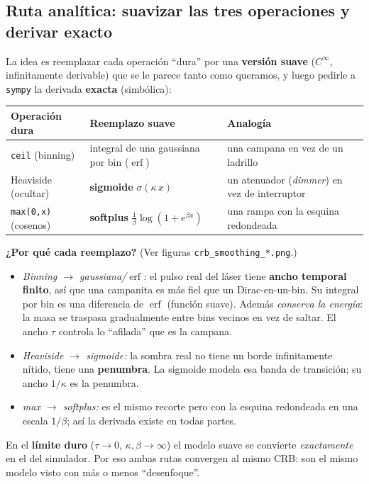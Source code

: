 \documentclass[11pt,a4paper]{article}
\newcommand{\erf}{\operatorname{erf}}
\begin{document}
\subsection{Ruta anal\'itica: suavizar las tres operaciones y derivar exacto}
La idea es reemplazar cada operaci\'on ``dura'' por una \textbf{versi\'on suave}
($C^\infty$, infinitamente derivable) que se le parece tanto como queramos, y
luego pedirle a \texttt{sympy} la derivada \textbf{exacta} (simb\'olica):
\begin{center}
\begin{tabular}{@{}lll@{}}
\toprule
Operaci\'on dura & Reemplazo suave & Analog\'ia\\
\midrule
\texttt{ceil} (binning) & integral de una gaussiana por bin ($\erf$) &
   una campana en vez de un ladrillo\\
Heaviside (ocultar) & \textbf{sigmoide} $\sigma(\kappa\,x)$ &
   un atenuador (\emph{dimmer}) en vez de interruptor\\
\texttt{max(0,x)} (cosenos) & \textbf{softplus} $\tfrac1\beta\log(1+e^{\beta x})$ &
   una rampa con la esquina redondeada\\
\bottomrule
\end{tabular}
\end{center}

\noindent \textbf{¿Por qu\'e cada reemplazo?} (Ver figuras \texttt{crb\_smoothing\_*.png}.)
\begin{itemize}[nosep]
  \item \emph{Binning $\to$ gaussiana/$\erf$:} el pulso real del l\'aser tiene
  \textbf{ancho temporal finito}, as\'i que una campanita es m\'as fiel que un
  Dirac-en-un-bin. Su integral por bin es una diferencia de $\erf$ (funci\'on
  suave). Adem\'as \emph{conserva la energ\'ia}: la masa se traspasa gradualmente
  entre bins vecinos en vez de saltar. El ancho $\tau$ controla lo ``afilada'' que
  es la campana.
  \item \emph{Heaviside $\to$ sigmoide:} la sombra real no tiene un borde
  infinitamente n\'itido, tiene una \textbf{penumbra}. La sigmoide modela esa
  banda de transici\'on; su ancho $1/\kappa$ es la penumbra.
  \item \emph{max $\to$ softplus:} es el mismo recorte pero con la esquina
  redondeada en una escala $1/\beta$; as\'i la derivada existe en todas partes.
\end{itemize}

En el \textbf{l\'imite duro} ($\tau\to0$, $\kappa,\beta\to\infty$) el modelo suave
se convierte \emph{exactamente} en el del simulador. Por eso ambas rutas
convergen al mismo CRB: son el mismo modelo visto con m\'as o menos ``desenfoque''.
\end{document}
